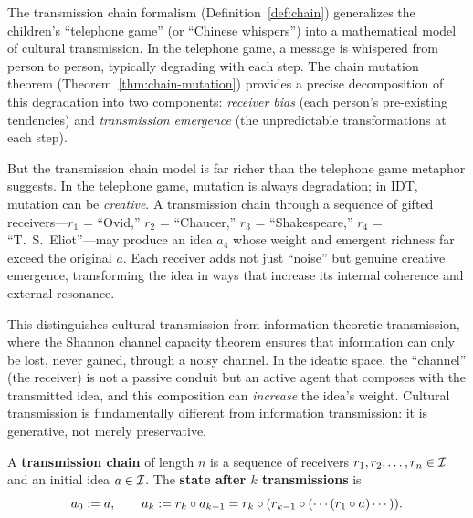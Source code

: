 \begin{interpretation}\label{interp:ch7:telephone_game}
The transmission chain formalism (Definition~\ref{def:chain}) generalizes
the children's ``telephone game'' (or ``Chinese whispers'') into a
mathematical model of cultural transmission. In the telephone game, a
message is whispered from person to person, typically degrading with each
step. The chain mutation theorem (Theorem~\ref{thm:chain-mutation})
provides a precise decomposition of this degradation into two components:
\emph{receiver bias} (each person's pre-existing tendencies) and
\emph{transmission emergence} (the unpredictable transformations at each
step).

But the transmission chain model is far richer than the telephone game
metaphor suggests. In the telephone game, mutation is always degradation;
in IDT, mutation can be \emph{creative}. A transmission chain through a
sequence of gifted receivers---$r_1$ = ``Ovid,'' $r_2$ = ``Chaucer,''
$r_3$ = ``Shakespeare,'' $r_4$ = ``T.~S.~Eliot''---may produce an idea
$a_4$ whose weight and emergent richness far exceed the original $a$.
Each receiver adds not just ``noise'' but genuine creative emergence,
transforming the idea in ways that increase its internal coherence and
external resonance.

This distinguishes cultural transmission from information-theoretic
transmission, where the Shannon channel capacity theorem ensures that
information can only be lost, never gained, through a noisy channel.
In the ideatic space, the ``channel'' (the receiver) is not a passive
conduit but an active agent that composes with the transmitted idea,
and this composition can \emph{increase} the idea's weight. Cultural
transmission is fundamentally different from information transmission:
it is generative, not merely preservative.
\end{interpretation}

\begin{definition}\label{def:chain}
A \textbf{transmission chain} of length $n$ is a sequence of receivers
$r_1, r_2, \ldots, r_n \in \mathcal{I}$ and an initial idea $a \in \mathcal{I}$. The
\textbf{state after $k$ transmissions} is
\[
    a_0 := a, \qquad a_k := r_k \circ a_{k-1}
    = r_k \circ (r_{k-1} \circ (\cdots (r_1 \circ a) \cdots)).
\]
\end{definition}

